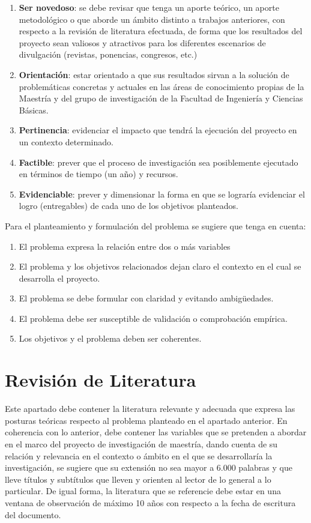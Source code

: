 \documentclass[spanish, letterpaper, 12pt]{book}
\begin{document}
\begin{enumerate}
	\item \textbf{Ser novedoso}: se debe revisar que tenga un aporte teórico, un aporte metodológico o que aborde un ámbito distinto a trabajos anteriores, con respecto a la revisión de literatura efectuada, de forma que los resultados del proyecto sean valiosos y atractivos para los diferentes escenarios de divulgación (revistas, ponencias, congresos, etc.)
	\item \textbf{Orientación}: estar orientado a que sus resultados sirvan a la solución de problemáticas concretas y actuales en las áreas de conocimiento propias de la Maestría y del grupo de investigación de la Facultad de Ingeniería y Ciencias Básicas.
	\item \textbf{Pertinencia}: evidenciar el impacto que tendrá la ejecución del proyecto en un contexto determinado.
	\item \textbf{Factible}: prever que el proceso de investigación sea posiblemente ejecutado en términos de tiempo (un año) y recursos.
	\item \textbf{Evidenciable}: prever y dimensionar la forma en que se lograría evidenciar el logro (entregables) de cada uno de los objetivos planteados.
\end{enumerate}

Para el planteamiento y formulación del problema se sugiere que tenga en cuenta:
\begin{enumerate}
	\item El problema expresa la relación entre dos o más variables
	\item El problema y los objetivos relacionados dejan claro el contexto en el cual se desarrolla el proyecto.
	\item El problema se debe formular con claridad y evitando ambigüedades.
	\item El problema debe ser susceptible de validación o comprobación empírica.
	\item Los objetivos y el problema deben ser coherentes.
\end{enumerate}


\chapter{Revisión de Literatura}
Este apartado debe contener la literatura relevante y adecuada que expresa las posturas teóricas respecto al problema planteado en el apartado anterior. En coherencia con lo anterior, debe contener las variables que se pretenden a abordar en el marco del proyecto de investigación de maestría, dando cuenta de su relación y relevancia en el contexto o ámbito en el que se desarrollaría la investigación, se sugiere que su extensión no sea mayor a 6.000 palabras y que lleve títulos y subtítulos que lleven y orienten al lector de lo general a lo particular. De igual forma, la literatura que se referencie debe estar en una ventana de observación de máximo 10 años con respecto a la fecha de escritura del documento.
\end{document}
